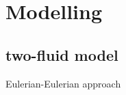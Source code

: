 \documentclass{beamer}
\begin{document}
\section{Modelling}

\subsection{two-fluid model}



\begin{frame}{Eulerian-Eulerian approach}


\end{frame}
\end{document}
